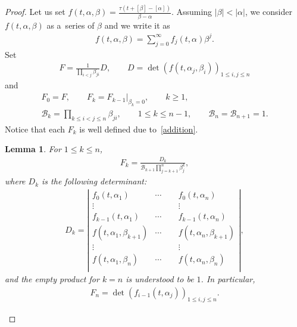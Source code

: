 \documentclass[10pt,a4paper]{amsart}
\numberwithin{equation}{section}
\newtheorem{Lemma}[Theorem]{Lemma}
\theoremstyle{definition}
\begin{document}
\begin{proof}
Let us set
$
f(t,\alpha,\beta)=\frac{\tau(t+[\beta]-[\alpha])}{\beta-\alpha}$.
Assuming $|\beta|<|\alpha|$, we consider $f(t,\alpha,\beta)$ as a~series of $\beta$ and
we write it as
\begin{gather}
f(t,\alpha,\beta)=\sum_{j=0}^\infty f_j(t,\alpha)\beta^j.
\label{f-expansion}
\end{gather}
Set
\begin{gather}
F=\frac{1}{\prod_{i<j}\beta_{ji}}D,
\qquad
 D=\det\left(f(t,\alpha_j,\beta_i)\right)_{1\leq i,j\leq n}
\label{def-F}
\end{gather}
and
\begin{gather}
F_0=F, \qquad F_{k}=F_{k-1}|_{\beta_{k}=0}, \qquad k\geq 1,\nonumber
\\
{\mathcal B}_k=\prod_{k\leq i<j\leq n}\beta_{ji}, \qquad 1\leq k\leq n-1,
\qquad
{\mathcal B}_n={\mathcal B}_{n+1}=1.\label{def-Fk}
\end{gather}
Notice that each $F_k$ is well defined due to~\eqref{addition}.

\begin{Lemma}
For $1\leq k\leq n$,
\begin{gather}
F_k=\frac{D_k}{{\mathcal B}_{k+1}\prod_{j=k+1}^n\beta_j^k},\label{Fk}
\end{gather}
where $D_k$ is the following determinant:
\begin{gather*}
D_k=
\left|
\begin{matrix}
f_0(t,\alpha_1)&\cdots&f_0(t,\alpha_n)\\
\vdots&\qquad&\vdots\\
f_{k-1}(t,\alpha_1)&\cdots&f_{k-1}(t,\alpha_n)\\
f(t,\alpha_1,\beta_{k+1})&\cdots&f(t,\alpha_n,\beta_{k+1})\\
\vdots&\qquad&\vdots\\
f(t,\alpha_1,\beta_{n})&\cdots&f(t,\alpha_n,\beta_{n})\\
\end{matrix}
\right|,
\end{gather*}
and the empty product  for $k=n$ is understood
to be $1$.
In particular, \begin{gather}
F_n=\det\left(f_{i-1}(t,\alpha_j)\right)_{1\leq i,j\leq n}.
\label{det-expression-1}
\end{gather}
\end{Lemma}



\end{proof}
\end{document}

